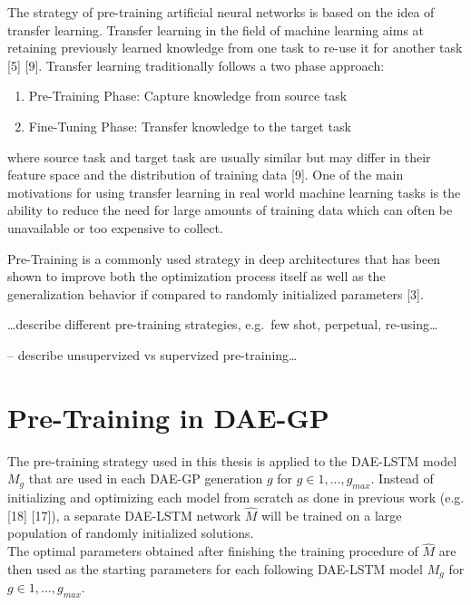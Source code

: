 \documentclass[
  11pt,
]{article}
\providecommand{\tightlist}{%
  \setlength{\itemsep}{0pt}\setlength{\parskip}{0pt}}
\begin{document}
The strategy of pre-training artificial neural networks is based on the idea of transfer learning.
Transfer learning in the field of machine learning aims at retaining previously learned knowledge from one task to re-use it for another task {[}5{]} {[}9{]}. Transfer learning traditionally follows a two phase approach:

\begin{enumerate}
\def\labelenumi{\arabic{enumi}.}
\tightlist
\item
  Pre-Training Phase: Capture knowledge from source task
\item
  Fine-Tuning Phase: Transfer knowledge to the target task
\end{enumerate}

where source task and target task are usually similar but may differ in their feature space and the distribution of training data {[}9{]}.
One of the main motivations for using transfer learning in real world machine learning tasks is the ability to reduce the need for large amounts of training data which can often be unavailable or too expensive to collect.

Pre-Training is a commonly used strategy in deep architectures that has been shown to improve both the optimization process itself as well as the generalization behavior if compared to randomly initialized parameters {[}3{]}.

\ldots describe different pre-training strategies, e.g.~few shot, perpetual, re-using\ldots{}

-- describe unsupervized vs supervized pre-training\ldots{}

\hypertarget{pre-training-in-dae-gp}{%
\section{Pre-Training in DAE-GP}\label{pre-training-in-dae-gp}}

The pre-training strategy used in this thesis is applied to the DAE-LSTM model \(M_g\) that are used in each DAE-GP generation \(g\) for \(g\in{1,...,g_{max}}\).
Instead of initializing and optimizing each model from scratch as done in previous work (e.g. {[}18{]} {[}17{]}), a separate DAE-LSTM network \(\hat{M}\) will be trained on a large population of randomly initialized solutions.\\
The optimal parameters obtained after finishing the training procedure of \(\hat{M}\) are then used as the starting parameters for each following DAE-LSTM model \(M_g\) for \(g\in{1,...,g_{max}}\).
\end{document}
